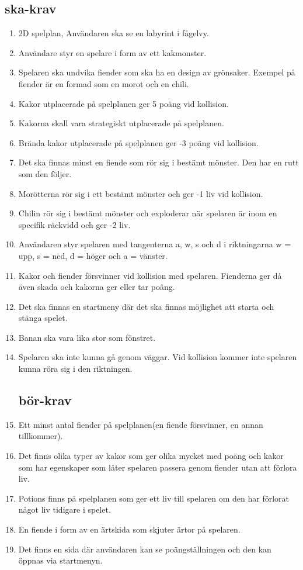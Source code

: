 \documentclass{TDP005mall}
\begin{document}
\subsection{ska-krav}
\begin{enumerate}
\item 2D spelplan, Användaren ska se en labyrint i fågelvy.
\item Användare styr en spelare i form av ett kakmonster.
\item Spelaren ska undvika fiender som ska ha en design av grönsaker. Exempel på fiender är en formad som en morot och en chili.
\item Kakor utplacerade på spelplanen ger 5 poäng vid kollision.
  \item Kakorna skall vara strategiskt utplacerade på spelplanen.
\item Brända kakor utplacerade på spelplanen ger -3 poäng vid kollision.
\item Det ska finnas minst en fiende som rör sig i bestämt mönster. Den har en rutt som den följer.
\item Morötterna rör sig i ett bestämt mönster och ger -1 liv vid kollision.
  \item Chilin rör sig i bestämt mönster och exploderar när spelaren är inom en specifik räckvidd och ger -2 liv. 
\item Användaren styr spelaren med tangenterna a, w, s och d i riktningarna w = upp, s = ned, d = höger och a = vänster.
\item Kakor och fiender försvinner vid kollision med spelaren. Fienderna ger då även skada och kakorna ger eller tar poäng.
\item Det ska finnas en startmeny där det ska finnas möjlighet att starta och stänga spelet.
\item Banan ska vara lika stor som fönstret.
  \item Spelaren ska inte kunna gå genom väggar. Vid kollision kommer inte spelaren kunna röra sig i den riktningen.

\subsection{bör-krav}
  \item Ett minst antal fiender på spelplanen(en fiende försvinner, en annan
    tillkommer).
  \item Det finns olika typer av kakor som ger olika mycket med poäng och kakor som har egenskaper som låter spelaren passera genom fiender utan att förlora liv.
  \item Potions finns på spelplanen som ger ett liv till spelaren om den har förlorat något liv tidigare i spelet.
  \item En fiende i form av en ärtskida som skjuter ärtor på spelaren.
    \item Det finns en sida där användaren kan se poängställningen och den kan öppnas via startmenyn.
  \end{enumerate}
\end{document}
